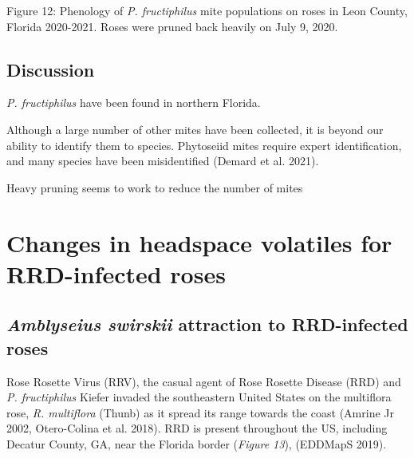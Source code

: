 \documentclass[12pt,final,CPage]{ufthesis}
\begin{document}
{  Figure 12: Phenology of \emph{P. fructiphilus} mite populations on roses in Leon County, Florida 2020-2021. Roses were pruned back heavily on July 9, 2020.

  \hypertarget{dis-survey-pheno}{%
  \section{Discussion}\label{dis-survey-pheno}}

  \emph{P. fructiphilus} have been found in northern Florida.

  Although a large number of other mites have been collected, it is beyond our ability to identify them to species. Phytoseiid mites require expert identification, and many species have been misidentified (Demard et al. 2021).

  Heavy pruning seems to work to reduce the number of mites

  

  \hypertarget{chemeco}{%
  \chapter{Changes in headspace volatiles for RRD-infected roses}\label{chemeco}}

  \hypertarget{chemeco-swirskii}{%
  \section{\texorpdfstring{\emph{Amblyseius swirskii} attraction to RRD-infected roses}{Amblyseius swirskii attraction to RRD-infected roses}}\label{chemeco-swirskii}}

  Rose Rosette Virus (RRV), the casual agent of Rose Rosette Disease (RRD) and \emph{P. fructiphilus} Kiefer invaded the southeastern United States on the multiflora rose, \emph{R. multiflora} (Thunb) as it spread its range towards the coast (Amrine Jr 2002, Otero-Colina et al. 2018). RRD is present throughout the US, including Decatur County, GA, near the Florida border (\emph{Figure 13}), (EDDMapS 2019).

}
\end{document}
